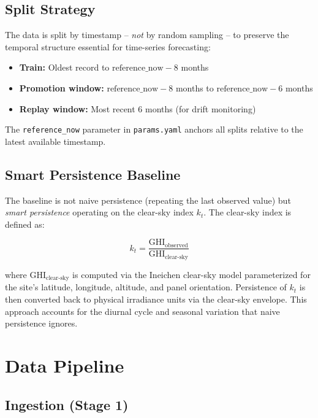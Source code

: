 \documentclass[11pt,a4paper]{article}
\begin{document}
\subsection{Split Strategy}

The data is split by timestamp -- \emph{not} by random sampling -- to preserve the temporal structure essential for time-series forecasting:

\begin{itemize}
    \item \textbf{Train:} Oldest record to $\text{reference\_now} - 8$ months
    \item \textbf{Promotion window:} $\text{reference\_now} - 8$ months to $\text{reference\_now} - 6$ months
    \item \textbf{Replay window:} Most recent 6 months (for drift monitoring)
\end{itemize}

The \texttt{reference\_now} parameter in \texttt{params.yaml} anchors all splits relative to the latest available timestamp.

\subsection{Smart Persistence Baseline}

The baseline is not naive persistence (repeating the last observed value) but \emph{smart persistence} operating on the clear-sky index $k_t$. The clear-sky index is defined as:

\begin{equation}
k_t = \frac{\text{GHI}_{\text{observed}}}{\text{GHI}_{\text{clear-sky}}}
\end{equation}

where $\text{GHI}_{\text{clear-sky}}$ is computed via the Ineichen clear-sky model parameterized for the site's latitude, longitude, altitude, and panel orientation. Persistence of $k_t$ is then converted back to physical irradiance units via the clear-sky envelope. This approach accounts for the diurnal cycle and seasonal variation that naive persistence ignores.

\section{Data Pipeline}

\subsection{Ingestion (Stage 1)}
\end{document}
